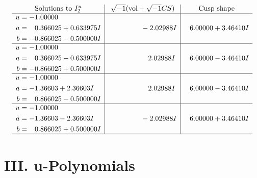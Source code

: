 \documentclass[1p]{elsarticle_modified}
\theoremstyle{definition}
\newcommand{\I}{\sqrt{-1}}
\begin{document}
$$\begin{array}{c|c|c}  
\text{Solutions to }I^u_{2}& \I (\text{vol} + \sqrt{-1}CS) & \text{Cusp shape}\\
 \hline 
\begin{aligned}
u &= -1.00000\phantom{ +0.000000I} \\
a &= \phantom{-}0.366025 + 0.633975 I \\
b &= -0.866025 - 0.500000 I\end{aligned}
 & \phantom{-0.000000 } -2.02988 I & \phantom{-}6.00000 + 3.46410 I \\ \hline\begin{aligned}
u &= -1.00000\phantom{ +0.000000I} \\
a &= \phantom{-}0.366025 - 0.633975 I \\
b &= -0.866025 + 0.500000 I\end{aligned}
 & \phantom{-0.000000 -}2.02988 I & \phantom{-}6.00000 - 3.46410 I \\ \hline\begin{aligned}
u &= -1.00000\phantom{ +0.000000I} \\
a &= -1.36603 + 2.36603 I \\
b &= \phantom{-}0.866025 - 0.500000 I\end{aligned}
 & \phantom{-0.000000 -}2.02988 I & \phantom{-}6.00000 - 3.46410 I \\ \hline\begin{aligned}
u &= -1.00000\phantom{ +0.000000I} \\
a &= -1.36603 - 2.36603 I \\
b &= \phantom{-}0.866025 + 0.500000 I\end{aligned}
 & \phantom{-0.000000 } -2.02988 I & \phantom{-}6.00000 + 3.46410 I\\
 \hline 
 \end{array}$$\newpage
\newpage\renewcommand{\arraystretch}{1}
\centering \section*{ III. u-Polynomials}
\end{document}
